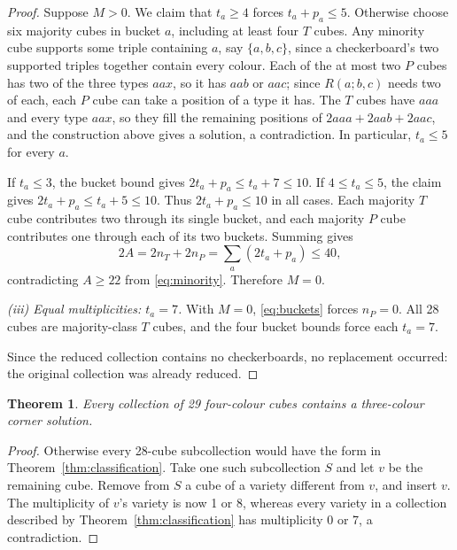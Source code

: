 \documentclass[11pt]{article}
\newtheorem{theorem}{Theorem}
\theoremstyle{remark}
\begin{document}
\begin{proof}
Suppose $M>0$. We claim that $t_a\ge4$ forces $t_a+p_a\le5$. Otherwise
choose six majority cubes in bucket $a$, including at least four $T$ cubes.
Any minority cube supports some triple containing $a$, say $\{a,b,c\}$,
since a checkerboard's two supported triples together contain every colour.
Each of the at most two $P$ cubes has two of the three types $aax$, so it
has $aab$ or $aac$; since $R(a;b,c)$ needs two of each, each $P$ cube can
take a position of a type it has. The $T$ cubes have $aaa$ and every type
$aax$, so they fill the remaining positions of $2aaa+2aab+2aac$, and the
construction above gives a solution, a contradiction. In particular,
$t_a\le5$ for every $a$.

If $t_a\le3$, the bucket bound gives $2t_a+p_a\le t_a+7\le10$.
If $4\le t_a\le5$, the claim gives $2t_a+p_a\le t_a+5\le10$.
Thus $2t_a+p_a\le10$ in all cases. Each majority $T$ cube contributes two
through its single bucket, and each majority $P$ cube contributes one
through each of its two buckets. Summing gives
\[
 2A=2n_T+2n_P=\sum_a(2t_a+p_a)\le40,
\]
contradicting $A\ge22$ from \eqref{eq:minority}. Therefore $M=0$.

\smallskip\noindent\emph{(iii) Equal multiplicities: $t_a=7$.}
With $M=0$, \eqref{eq:buckets} forces $n_P=0$. All 28 cubes are majority-class
$T$ cubes, and the four bucket bounds force each $t_a=7$.

Since the reduced collection contains no checkerboards, no replacement
occurred: the original collection was already reduced.
\end{proof}

\begin{theorem}\label{thm:upper}
Every collection of 29 four-colour cubes contains a three-colour corner
solution.
\end{theorem}
\begin{proof}
Otherwise every 28-cube subcollection would have the form in
Theorem~\ref{thm:classification}. Take one such subcollection $S$ and let
$v$ be the remaining cube. Remove from $S$ a cube of a variety different
from $v$, and insert $v$. The multiplicity of $v$'s variety is now 1 or 8,
whereas every variety in a collection described by
Theorem~\ref{thm:classification} has multiplicity 0 or 7, a contradiction.
\end{proof}

\Needspace{0.8\textheight}
\end{document}
